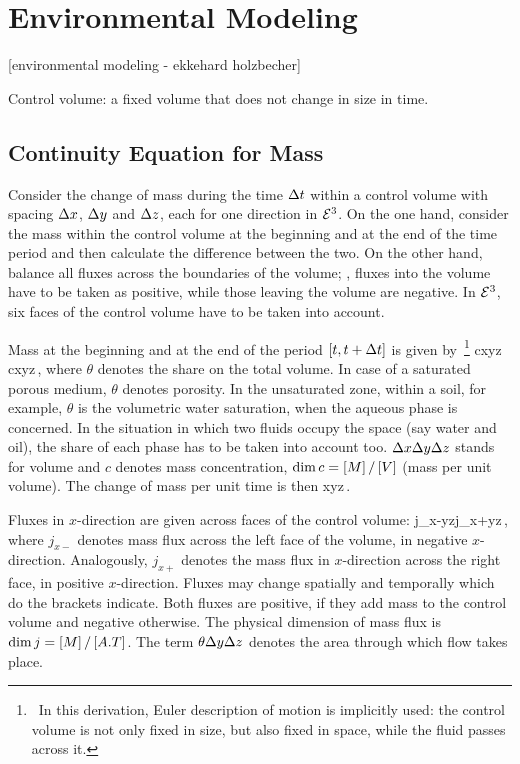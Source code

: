 \section{Environmental Modeling}
[environmental modeling - ekkehard holzbecher]

Control volume: a fixed volume that does not change in size in time.


\subsection{Continuity Equation for Mass}
Consider the change of mass during the time $\Delta t$ within a control volume with spacing $\Delta x$, $\Delta y$ and $\Delta z$, each for one direction in $\mathcal{E}^{3}$. On the one hand, consider the mass within the control volume at the beginning and at the end of the time period and then calculate the difference between the two. On the other hand, balance all fluxes across the boundaries of the volume; \ie, fluxes into the volume have to be taken as positive, while those leaving the volume are negative. In $\mathcal{E}^{3}$, six faces of the control volume have to be taken into account.

Mass at the beginning and at the end of the period $[t, t+\Delta t]$ is given by~\footnote{~In this derivation, Euler description of motion is implicitly used: the control volume is not only fixed in size, but also fixed in space, while the fluid passes across it.}
\beq
\theta c\diff x\diff y\diff z \qquad{}\qquad \theta c\diff x\diff y\diff z\,,
\eeq
where $\theta$ denotes the share on the total volume. In case of a saturated porous medium, $\theta$ denotes porosity. In the unsaturated zone, within a soil, for example, $\theta$ is the volumetric water saturation, when the aqueous phase is concerned. In the situation in which two fluids occupy the space (say water and oil), the share of each phase has to be taken into account too. $\Delta x\Delta y\Delta z$ stands for volume and $c$ denotes mass concentration, $\dim c = \left[{M}\right]/\left[{V}\right]$ (mass per unit volume). The change of mass per unit time is then
\beq
\theta{}\diff x\diff y\diff z\,.
\eeq

Fluxes in $x$-direction are given across faces of the control volume:
\beq
\theta j_{x-}\diff y\diff z\qquad{}\qquad\theta j_{x+}\diff y\diff z\,,
\eeq
where $j_{x-}$ denotes mass flux across the left face of the volume, in negative $x$-direction. Analogously, $j_{x+}$ denotes the mass flux in $x$-direction across the right face, in positive $x$-direction. Fluxes may change spatially and temporally which do the brackets indicate. Both fluxes are positive, if they add mass to the control volume and negative otherwise. The physical dimension of mass flux is $\dim j = \left[{M}\right]/\left[{A.T}\right]$. The term $\theta\Delta y\Delta z$ denotes the area through which flow takes place.


